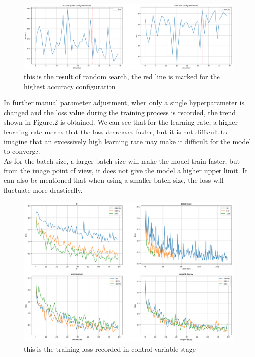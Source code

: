 \documentclass[12pt]{article}
\begin{document}
\begin{figure}[htbp]
    \centering
    \includegraphics[width=\columnwidth,height=0.3\linewidth]{output.png}
    \caption{this is the result of random search, the red line is marked for the highest accuracy configuration}
\end{figure}

In further manual parameter adjustment, when only a single hyperparameter is changed and the loss value during the training process is recorded, the trend shown in Figure.2 is obtained. We can see that for the learning rate, a higher learning rate means that the loss decreases faster, but it is not difficult to imagine that an excessively high learning rate may make it difficult for the model to converge.\\
As for the batch size, a larger batch size will make the model train faster, but from the image point of view, it does not give the model a higher upper limit. It can also be mentioned that when using a smaller batch size, the loss will fluctuate more drastically.


\begin{figure}[htbp]
    \centering
    \includegraphics[width=\columnwidth,height=0.5\linewidth]{output2.png}
    \caption{this is the training loss recorded in control variable stage}
\end{figure}
\end{document}
